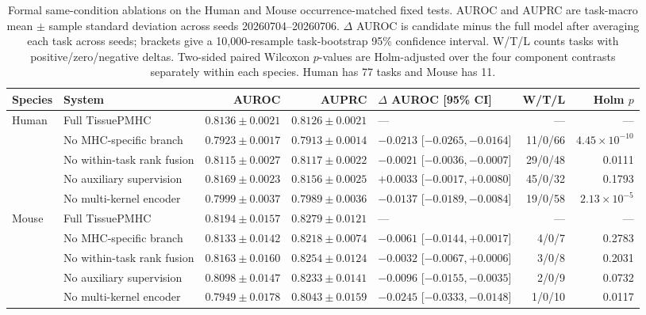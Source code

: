 \begin{table}[t]
\centering
\caption{Formal same-condition ablations on the Human and Mouse occurrence-matched fixed tests. AUROC and AUPRC are task-macro mean $\pm$ sample standard deviation across seeds 20260704--20260706. $\Delta$ AUROC is candidate minus the full model after averaging each task across seeds; brackets give a 10,000-resample task-bootstrap 95\% confidence interval. W/T/L counts tasks with positive/zero/negative deltas. Two-sided paired Wilcoxon $p$-values are Holm-adjusted over the four component contrasts separately within each species. Human has 77 tasks and Mouse has 11.}
\label{tab:component-evidence}
\fontsize{7.2}{8.2}\selectfont
\setlength{\tabcolsep}{2.2pt}
\begin{tabularx}{\textwidth}{@{}llrr>{\raggedleft\arraybackslash}p{3.1cm}rr@{}}
\toprule
Species & System & AUROC & AUPRC & $\Delta$ AUROC [95\% CI] & W/T/L & Holm $p$ \\
\midrule
Human & Full TissuePMHC & $0.8136\pm0.0021$ & $0.8126\pm0.0021$ & --- & --- & --- \\
& No MHC-specific branch & $0.7923\pm0.0017$ & $0.7913\pm0.0014$ & $-0.0213$ [$-0.0265,-0.0164$] & 11/0/66 & $4.45\times10^{-10}$ \\
& No within-task rank fusion & $0.8115\pm0.0027$ & $0.8117\pm0.0022$ & $-0.0021$ [$-0.0036,-0.0007$] & 29/0/48 & 0.0111 \\
& No auxiliary supervision & $0.8169\pm0.0023$ & $0.8156\pm0.0025$ & $+0.0033$ [$-0.0017,+0.0080$] & 45/0/32 & 0.1793 \\
& No multi-kernel encoder & $0.7999\pm0.0037$ & $0.7989\pm0.0036$ & $-0.0137$ [$-0.0189,-0.0084$] & 19/0/58 & $2.13\times10^{-5}$ \\
\midrule
Mouse & Full TissuePMHC & $0.8194\pm0.0157$ & $0.8279\pm0.0121$ & --- & --- & --- \\
& No MHC-specific branch & $0.8133\pm0.0142$ & $0.8218\pm0.0074$ & $-0.0061$ [$-0.0144,+0.0017$] & 4/0/7 & 0.2783 \\
& No within-task rank fusion & $0.8163\pm0.0160$ & $0.8254\pm0.0124$ & $-0.0032$ [$-0.0067,+0.0006$] & 3/0/8 & 0.2031 \\
& No auxiliary supervision & $0.8098\pm0.0147$ & $0.8233\pm0.0141$ & $-0.0096$ [$-0.0155,-0.0035$] & 2/0/9 & 0.0732 \\
& No multi-kernel encoder & $0.7949\pm0.0178$ & $0.8043\pm0.0159$ & $-0.0245$ [$-0.0333,-0.0148$] & 1/0/10 & 0.0117 \\
\bottomrule
\end{tabularx}
\end{table}

